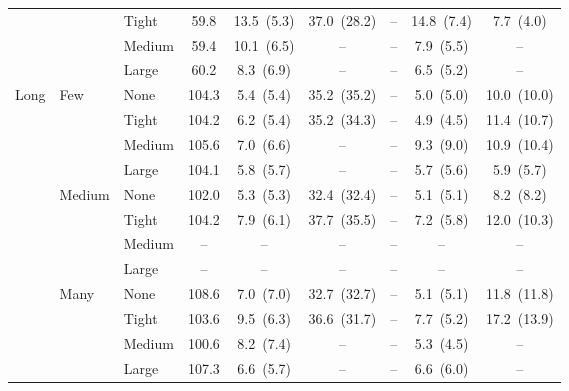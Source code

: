 \documentclass[preprint,12pt,3p]{elsarticle}
\newcommand{\blue}[1]{{\color{darkblue}#1}}
\begin{document}
\begin{table}[htbp]
{\begin{tabular}{lll c ccccc}
 &  & {\small Tight} & 59.8 & \blue{13.5~{\scriptsize(5.3)}} & 37.0~{\scriptsize(28.2)} & -- & 14.8~{\scriptsize(7.4)} & 7.7~{\scriptsize(4.0)} \\
 &  & {\small Medium} & \blue{59.4} & \blue{10.1~{\scriptsize(6.5)}} & -- & -- & \blue{7.9~{\scriptsize(5.5)}} & -- \\
 &  & {\small Large} & \blue{60.2} & \blue{8.3~{\scriptsize(6.9)}} & -- & -- & \blue{6.5~{\scriptsize(5.2)}} & -- \\
\midrule
\multirow{12}{*}{\small Long} & \multirow{4}{*}{\small Few} & {\small None} & 104.3 & \blue{5.4~{\scriptsize(5.4)}} & 35.2~{\scriptsize(35.2)} & -- & 5.0~{\scriptsize(5.0)} & 10.0~{\scriptsize(10.0)} \\
 &  & {\small Tight} & 104.2 & \blue{6.2~{\scriptsize(5.4)}} & 35.2~{\scriptsize(34.3)} & -- & 4.9~{\scriptsize(4.5)} & 11.4~{\scriptsize(10.7)} \\
 &  & {\small Medium} & \blue{105.6} & \blue{7.0~{\scriptsize(6.6)}} & -- & -- & \blue{9.3~{\scriptsize(9.0)}} & \blue{10.9~{\scriptsize(10.4)}} \\
 &  & {\small Large} & \blue{104.1} & \blue{5.8~{\scriptsize(5.7)}} & -- & -- & \blue{5.7~{\scriptsize(5.6)}} & \blue{5.9~{\scriptsize(5.7)}} \\
 & \multirow{4}{*}{\small Medium} & {\small None} & 102.0 & \blue{5.3~{\scriptsize(5.3)}} & 32.4~{\scriptsize(32.4)} & -- & 5.1~{\scriptsize(5.1)} & 8.2~{\scriptsize(8.2)} \\
 &  & {\small Tight} & 104.2 & \blue{7.9~{\scriptsize(6.1)}} & \blue{37.7~{\scriptsize(35.5)}} & -- & 7.2~{\scriptsize(5.8)} & 12.0~{\scriptsize(10.3)} \\
 &  & {\small Medium} & \blue{--} & \blue{--} & \blue{--} & -- & \blue{--} & \blue{--} \\
 &  & {\small Large} & \blue{--} & \blue{--} & \blue{--} & -- & \blue{--} & \blue{--} \\
 & \multirow{4}{*}{\small Many} & {\small None} & 108.6 & \blue{7.0~{\scriptsize(7.0)}} & 32.7~{\scriptsize(32.7)} & -- & 5.1~{\scriptsize(5.1)} & 11.8~{\scriptsize(11.8)} \\
 &  & {\small Tight} & 103.6 & \blue{9.5~{\scriptsize(6.3)}} & 36.6~{\scriptsize(31.7)} & -- & 7.7~{\scriptsize(5.2)} & 17.2~{\scriptsize(13.9)} \\
 &  & {\small Medium} & \blue{100.6} & \blue{8.2~{\scriptsize(7.4)}} & -- & -- & \blue{5.3~{\scriptsize(4.5)}} & -- \\
 &  & {\small Large} & \blue{107.3} & \blue{6.6~{\scriptsize(5.7)}} & -- & -- & \blue{6.6~{\scriptsize(6.0)}} & -- \\
\bottomrule
\end{tabular}%
}
\end{table}
\end{document}
